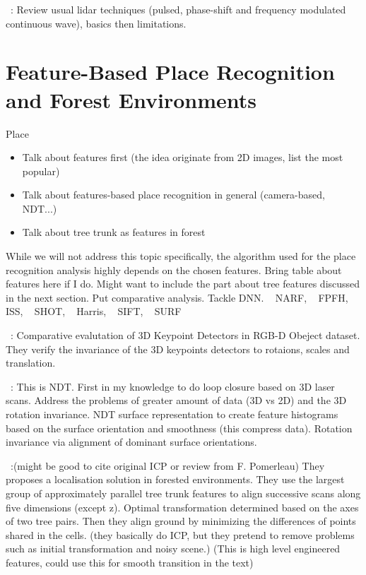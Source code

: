 ~\cite{Bosch2001}:
Review usual lidar techniques (pulsed, phase-shift and frequency modulated continuous wave), basics then limitations.


\section{Feature-Based Place Recognition and Forest Environments}
\label{sec:literature_slam}
Place 
\begin{itemize}
    \item Talk about features first (the idea originate from 2D images, list the most popular)
    \item Talk about features-based place recognition in general (camera-based, NDT...)
    \item Talk about tree trunk as features in forest
\end{itemize}

While we will not address this topic specifically, the algorithm used for the place recognition analysis highly depends on the chosen features.  
Bring table about features here if I do. Might want to include the part about tree features discussed in the next section. Put comparative analysis. Tackle DNN.
~\cite{Steder2011a} NARF, ~\cite{Rusu2009} FPFH, ~\cite{Yu2009} ISS, ~\cite{Tombari2010} SHOT, ~\cite{Harris1988} Harris, ~\cite{Lowe2004} SIFT, ~\cite{Bay2006} SURF

~\cite{Filipe2014}:
Comparative evalutation of 3D Keypoint Detectors in RGB-D Obeject dataset. They verify the invariance of the 3D keypoints detectors to rotaions, scales and translation.

~\cite{Magnusson2009}:
This is NDT. First in my knowledge to do loop closure based on 3D laser scans. Address the problems of greater amount of data (3D vs 2D) and the 3D rotation invariance. NDT surface representation to create feature histograms based on the surface orientation and smoothness (this compress data). Rotation invariance via alignment of dominant surface orientations.

~\cite{Song2012}:(might be good to cite original ICP or review from F. Pomerleau)
They proposes a localisation solution in forested environments. They use the largest group of approximately parallel tree trunk features to align successive scans along five dimensions (except z). Optimal transformation determined based on the axes of two tree pairs. Then they align ground by minimizing the differences of points shared in the cells. (they basically do ICP, but they pretend to remove problems such as initial transformation and noisy scene.) (This is high level engineered features, could use this for smooth transition in the text)


